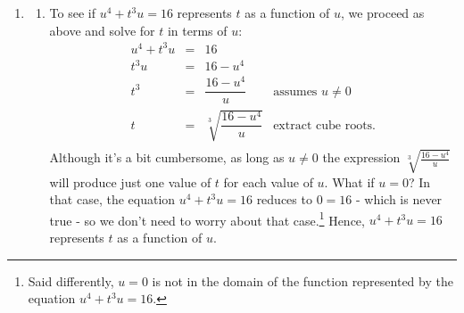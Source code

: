\documentclass{ximera}
\begin{document}
\begin{example}
\begin{enumerate}
\begin{enumerate}
\[\begin{array}{rclr}
\end{array} \] The presence of the `$\pm$' indicates that there is a good chance that for some $x$-value, the equation will produce \textbf{two} corresponding $y$-values.  Indeed, $x = 0$ produces $y = \pm \sqrt{25 - 0^{3}} = \pm 5$.  Hence, $x^{3} + y^{2} = 25$ equation does \textbf{not} represent $y$ as a function of $x$ because $x = 0$ is matched with more than one $y$-value.  If you need to review solving equations like this, see Section \ref{AppRadEqus} for a review.

\item  To see if $x^{3} + y^{2} = 25$ represents $x$ as a function of $y$, we solve the equation for $x$ in terms of $y$: \[ \begin{array}{rclr}

x^{3} + y^{2}  & = &  25 & \\

x^{3} & = & 25 - y^{2}& \\

x & = &  \sqrt[3]{25 - y^{2}} \\

\end{array} \] In this case, each choice of $y$ produces only \textbf{one} corresponding value for $x$, so   $x^{3} + y^{2} = 25$ represents $x$ as a function of $y$.

\end{enumerate}

\item

\begin{enumerate}

\item  To see if  $u^{4} + t^{3}u = 16$ represents $t$ as a function of $u$, we proceed as above and solve for $t$ in terms of $u$: \[ \begin{array}{rclr}

u^{4} + t^{3} u  & = &  16 & \\

t^{3} u & = & 16 - u^{4} & \\ [6pt]

t^{3} & = & \dfrac{16 - u^{4}}{u} & \text{assumes $u \neq 0$} \\ [10pt]

t & = & \sqrt[3]{\dfrac{16 - u^{4}}{u}} & \text{extract cube roots.} \\

\end{array} \] Although it's a bit cumbersome, as long as $u \neq 0$ the expression  $\sqrt[3]{\frac{16-u^4}{u}}$ will produce just one value of $t$ for each value of $u$.  What if $u = 0$? In that case, the equation $u^{4} + t^{3}u = 16$ reduces to $0 = 16$ - which is never true - so we don't need to worry about that case.\footnote{Said differently, $u = 0$ is not in the domain of the function represented by the equation $u^{4} + t^{3}u = 16$.}  Hence, $u^{4} + t^{3}u = 16$ represents $t$ as a function of $u$.


\end{enumerate}
\end{enumerate}
\end{example}
\end{document}
